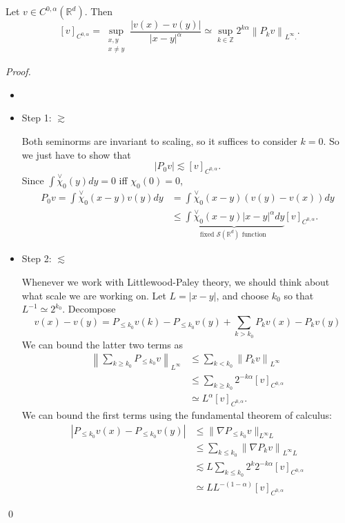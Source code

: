 \begin{lemma}
\label{lem: Littlewood-Paley characterization of holder space}
Let $v \in C^{0, \alpha}\left(\mathbb{R}^{d}\right)$. Then
$$
[v]_{C^{0, \alpha}}=\sup _{\substack{x, y \\ x \neq y}} \frac{|v(x)-v(y)|}{|x-y|^{\alpha}} \simeq \sup _{k \in \mathbb{Z}} 2^{k \alpha}\left\|P_{k} v\right\|_{L^{\infty} .} .
$$
\end{lemma}
\begin{proof}
\begin{itemize}
    \item []
    \item Step 1: $\gtrsim$
    
    Both seminorms are invariant to scaling, so it suffices to consider $k=0$. So we just have to show that
$$
\left|P_{0} v\right| \lesssim[v]_{C^{0, \alpha}} .
$$
Since $\int \stackrel{\vee}{\chi}_{0}(y) d y=0$ iff $\chi_{0}(0)=0$,
\[
    \begin{aligned}
P_{0} v=\int \stackrel{\vee}{\chi}_{0}(x-y) v(y) d y &=\int \stackrel{\vee}{\chi}_{0}(x-y)(v(y)-v(x)) d y \\
& \leq \underbrace{\int \stackrel{\vee}{\chi}_{0}(x-y)|x-y|^{\alpha} d y}_{\text {fixed } \mathcal{S}\left(\mathbb{R}^{d}\right) \text { function }} [v]_{C^{0,\alpha}}.
\end{aligned}
\]
\item Step 2: $\lesssim$

Whenever we work with Littlewood-Paley theory, we should think about what scale we are working on. Let $L=|x-y|$, and choose $k_{0}$ so that $L^{-1} \simeq 2^{k_{0}}$. Decompose
$$
v(x)-v(y)=P_{\leq k_{0}} v(k)-P_{\leq k_{0}} v(y)+\sum_{k>k_{0}} P_{k} v(x)-P_{k} v(y)
$$
We can bound the latter two terms as
\begin{align*}
    \left\|\sum_{k \geq k_{0}} P_{\leq k_{0}} v\right\|_{L^{\infty}} &\leq \sum_{k<k_{0}}\left\|P_{k} v\right\|_{L^{\infty}}\\
&\leq \sum_{k \geq k_{0}} 2^{-k \alpha}[v]_{C^{0, \alpha}} \\
&\simeq L^{\alpha}[v]_{C^{0, \alpha}} .
\end{align*}
We can bound the first terms using the fundamental theorem of calculus:
$$
\begin{aligned}
\left|P_{\leq k_{0}} v(x)-P_{\leq k_{0}} v(y)\right| & \leq \| \nabla P_{\leq k_{0}} v \|_{L^{\infty} L} \\
& \leq \sum_{k \leq k_{0}}\left\|\nabla P_{k} v\right\|_{L^{\infty} L} \\
& \lesssim L \sum_{k \leq k_{0}} 2^{k} 2^{-k \alpha}[v]_{C^{0, \alpha}} \\
& \simeq L L^{-(1-\alpha)}[v]_{C^{0, \alpha}}
\end{aligned}
$$
\end{itemize}
\qed
\end{proof}

